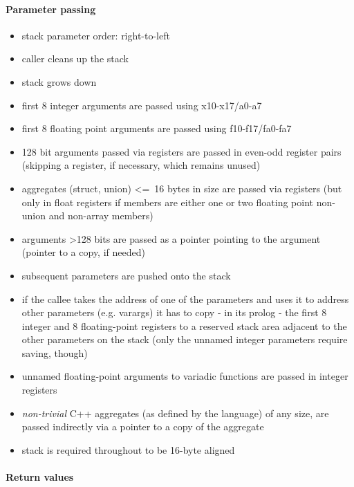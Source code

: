 \paragraph{Parameter passing}

\begin{itemize}
\item stack parameter order: right-to-left
\item caller cleans up the stack
\item stack grows down
\item first 8 integer arguments are passed using x10-x17/a0-a7
\item first 8 floating point arguments are passed using f10-f17/fa0-fa7
\item 128 bit arguments passed via registers are passed in even-odd register pairs (skipping a register, if necessary, which remains unused)
\item aggregates (struct, union) \textless=\ 16 bytes in size are passed via registers (but only in float registers if members are either one or two floating point non-union and non-array members)
\item arguments \textgreater 128 bits are passed as a pointer pointing to the argument (pointer to a copy, if needed)
\item subsequent parameters are pushed onto the stack
\item if the callee takes the address of one of the parameters and uses it to address other parameters (e.g. varargs) it has to copy - in its prolog - the first 8 integer
and 8 floating-point registers to a reserved stack area adjacent to the other parameters on the stack (only the unnamed integer parameters require saving, though)
\item unnamed floating-point arguments to variadic functions are passed in integer registers
\item {\it non-trivial} C++ aggregates (as defined by the language) of any size, are passed indirectly via a pointer to a copy of the aggregate
\item stack is required throughout to be 16-byte aligned
\end{itemize}

\paragraph{Return values}

